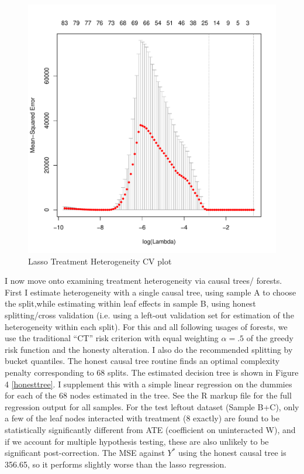 \documentclass{article}
\begin{document}


\begin{figure}[!ht]
\center
\caption{Lasso Treatment Heterogeneity CV plot}
\label{lassocv}
\includegraphics[scale=.7]{lasso_CV.pdf}
\end{figure}


I now move onto examining treatment heterogeneity via causal trees/ forests. First I estimate heterogeneity with a single causal tree, using sample A to choose the split,while estimating within leaf effects in sample B, using honest splitting/cross validation (i.e. using a left-out validation set for estimation of the heterogeneity within each split). For this and all following usages of forests, we use the traditional ``CT'' risk criterion with equal weighting $\alpha=.5$ of the greedy risk function and the honesty alteration. I also do the recommended splitting by bucket quantiles. The honest causal tree routine finds an optimal complexity penalty corresponding to 68 splits. The estimated decision tree is shown in Figure 4 \ref{honesttree}. I supplement this with a simple linear regression on the dummies for each of the 68 nodes estimated in the tree. See the R markup file for the full regression output for all samples. For the test leftout dataset (Sample B+C), only a few of the leaf nodes interacted with treatment (8 exactly) are found to be statistically significantly different from ATE (coefficient on uninteracted W), and if we account for multiple hypothesis testing, these are also unlikely to be significant post-correction. The MSE against $Y^*$ using the honest causal tree is 356.65, so it performs slightly worse than the lasso regression.
%
\end{document}
